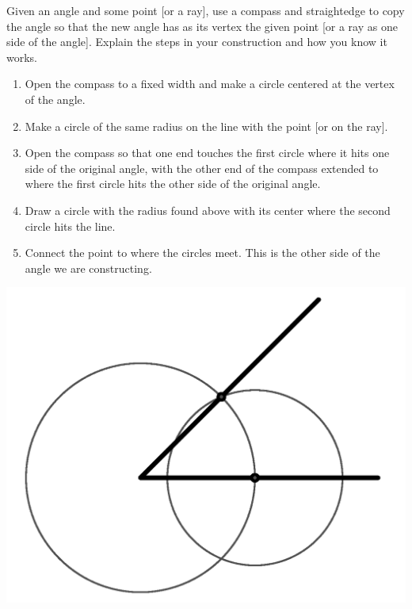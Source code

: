 \documentclass[nooutcomes]{ximera}
\begin{document}
\begin{problem}
Given an angle and some point [or a ray], use a compass and straightedge to copy the angle so that the new angle has as its vertex the given point [or a ray as one side of the angle]. Explain the steps in your construction and how you know it works.
\begin{freeResponse}
\begin{hint}%
\begin{enumerate}
\item Open the compass to a fixed width and make a circle 
centered at the vertex of the angle.
\item Make a circle of the same radius on the line with the point [or on the ray].
\item Open the compass so that one end touches the first circle 
where it hits one side of the original angle, with the other end of the compass extended to where the first circle hits the other side of the original angle.
\item Draw a circle with the radius found above with its center 
where the second circle hits the line.
\item Connect the point to where the circles meet. This is the other side of the angle we are constructing.
\end{enumerate}
\begin{image}
\includegraphics{copyangle.png}
\end{image}
\end{hint}
\end{freeResponse}
\end{problem}
\end{document}
